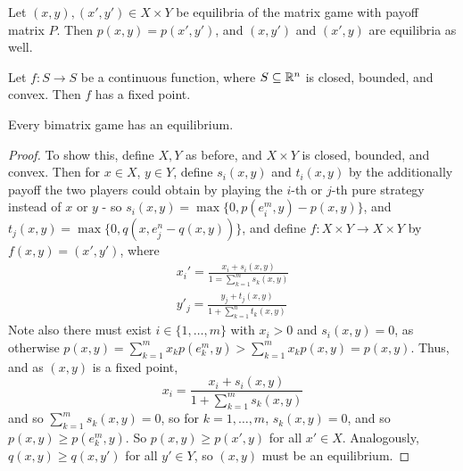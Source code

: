 \begin{thm}
  \label{sec:strat-equil-3}
  Let $(x, y), (x', y') \in X \times Y$ be equilibria of the matrix
  game with payoff matrix $P$.  Then $p(x, y) = p(x', y')$, and $(x,
  y')$ and $(x', y)$ are equilibria as well.
\end{thm}

\begin{thm}
  \label{sec:strat-equil-5}
  Let $f: S \rightarrow S$ be a continuous function, where $S
  \subseteq \mathbb{R}^{n}$ is closed, bounded, and convex. Then $f$ has a
  fixed point.
\end{thm}

\begin{thm}
  \label{sec:strat-equil-4}
  Every bimatrix game has an equilibrium.
\end{thm}

\begin{proof}
  To show this, define $X, Y$ as before, and $X \times Y$ is closed,
  bounded, and convex. Then for $x \in X$, $y \in Y$, define $s_{i}(x,
  y)$ and $t_{i} (x, y)$ by the additionally payoff the two players
  could obtain by playing the $i$-th or $j$-th pure strategy instead
  of $x$ or $y$ - so $s_{i}(x, y) = \max \{ 0, p(e_{i}^{m}, y) - p(x,
  y) \} $, and $t_{j}(x, y) = \max \{ 0, q(x, e_{j}^{n} - q(x, y))
  \}$, and define $f: X \times Y \rightarrow X \times Y$ by $f(x, y) =
  (x', y')$, where
  \begin{align}
    \label{eq:18}
    x_{i}' = \frac{x_{i} + s_{i}(x, y)}{1 = \sum_{k=1}^{m} s_{k}(x,
      y)}
    \\
    y'_{j} = \frac{y_{j} + t_{j}(x, y)}{1 + \sum_{k=1}^{n} t_{k}(x,
      y)}
  \end{align}
  Note also there must exist $i \in \{ 1, \dots, m \} $ with $x_{i} >
  0$ and $s_{i}(x, y) = 0$, as otherwise $p(x, y) = \sum_{k=1}^{m}
  x_{k} p(e_{k}^{m}, y) > \sum_{k=1}^{m} x_{k} p(x, y) = p(x, y)$.
  Thus, and as $(x, y)$ is a fixed point,
  \begin{equation}
    \label{eq:19}
    x_{i} = \frac{x_{i} + s_{i}(x, y)}{1 + \sum_{k=1}^{m} s_{k}(x, y)}
  \end{equation}
  and so $\sum_{k=1}^{m} s_{k}(x, y) = 0$, so for $k = 1, \dots, m$,
  $s_{k}(x, y) = 0$, and so $p(x, y) \geq p(e_{k}^{m}, y)$. So $p(x,
  y) \geq p(x', y)$ for all $x' \in X$. Analogously, $q(x, y) \geq
  q(x, y')$ for all $y' \in Y$, so $(x, y)$ must be an equilibrium.
\end{proof}

